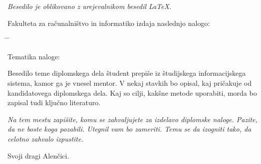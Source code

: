 \documentclass[a4paper, 12pt]{book}
\newcommand{\clearemptydoublepage}{\newpage{\pagestyle{empty}\cleardoublepage}}
\begin{document}
\begin{center}
\mbox{}\vfill
\emph{Besedilo je oblikovano z urejevalnikom besedil \LaTeX.}
\end{center}
\clearemptydoublepage

\thispagestyle{empty}
\vspace*{4cm}

\noindent
Fakulteta za računalništvo in informatiko izdaja naslednjo nalogo:
\medskip
\begin{tabbing}
\hspace{32mm}\= \hspace{6cm} \= \kill




Tematika naloge:
\end{tabbing}
Besedilo teme diplomskega dela študent prepiše iz študijskega informacijskega sistema, kamor ga je vnesel mentor. V nekaj stavkih bo opisal, kaj pričakuje od kandidatovega diplomskega dela. Kaj so cilji, kakšne metode uporabiti, morda bo zapisal tudi ključno literaturo.
\vspace{15mm}






\vspace{2cm}

\clearemptydoublepage

\thispagestyle{empty}\mbox{}\vfill\null\it%
\noindent
Na tem mestu zapišite, komu se zahvaljujete za izdelavo diplomske naloge. Pazite, da ne boste koga pozabili. Utegnil vam bo zameriti. Temu se da izogniti tako, da celotno zahvalo izpustite.
\rm\normalfont

\clearemptydoublepage

\thispagestyle{empty}\mbox{}{\textheight}\mbox{}\hfill\begin{minipage}{0.55\textwidth}%
Svoji dragi Alenčici.
\normalfont\end{minipage}

\clearemptydoublepage


\pagestyle{empty}
\def\thepage{}%
\tableofcontents{}


\clearemptydoublepage

\end{document}
